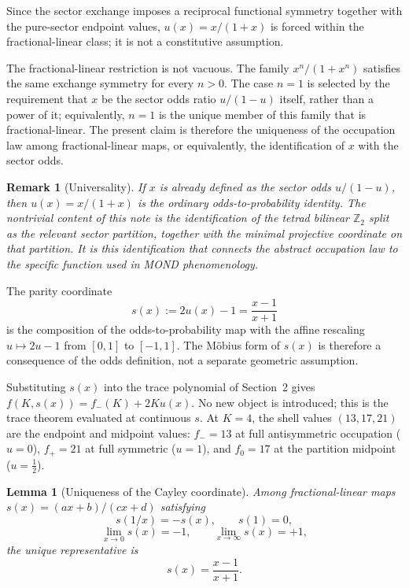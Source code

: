 \documentclass[10pt]{article}
\newtheorem{lemma}{Lemma}
\newtheorem{remark}{Remark}
\begin{document}
Since the sector exchange imposes a reciprocal functional symmetry together
with the pure-sector endpoint values, $u(x)=x/(1+x)$ is forced within the
fractional-linear class; it is not a constitutive assumption.

The fractional-linear restriction is not vacuous.  The family
$x^n/(1+x^n)$ satisfies the same exchange symmetry for every $n>0$.
The case $n=1$ is selected by the requirement that $x$ be the sector odds
ratio $u/(1-u)$ itself, rather than a power of it; equivalently, $n=1$ is
the unique member of this family that is fractional-linear.  The present
claim is therefore the uniqueness of the occupation law among
fractional-linear maps, or equivalently, the identification of $x$ with
the sector odds.

\begin{remark}[Universality]
If $x$ is already defined as the sector odds $u/(1-u)$, then
$u(x)=x/(1+x)$ is the ordinary odds-to-probability identity.  The
nontrivial content of this note is the identification of the tetrad
bilinear $\mathbb Z_2$ split as the relevant sector partition, together
with the minimal projective coordinate on that partition.  It is this
identification that connects the abstract occupation law to the specific
function used in MOND phenomenology.
\end{remark}

The parity coordinate
\[
        s(x):=2u(x)-1=\frac{x-1}{x+1}
\]
is the composition of the odds-to-probability map with the affine rescaling
$u\mapsto 2u-1$ from $[0,1]$ to $[-1,1]$.  The Möbius form of $s(x)$ is
therefore a consequence of the odds definition, not a separate geometric
assumption.

Substituting $s(x)$ into the trace polynomial of Section~2 gives
$f(K,s(x))=f_-(K)+2Ku(x)$.  No new object is introduced; this is the trace
theorem evaluated at continuous $s$.  At $K=4$, the shell values $(13,17,21)$
are the endpoint and midpoint values: $f_-=13$ at full antisymmetric occupation ($u=0$),
$f_+=21$ at full symmetric ($u=1$), and $f_0=17$ at the partition midpoint
($u=\frac12$).

\begin{lemma}[Uniqueness of the Cayley coordinate]
Among fractional-linear maps $s(x)=(ax+b)/(cx+d)$ satisfying
\[
        s(1/x)=-s(x),\qquad s(1)=0,
\]
\[
        \lim_{x\to0}s(x)=-1,
        \qquad
        \lim_{x\to\infty}s(x)=+1,
\]
the unique representative is
\[
        s(x)=\frac{x-1}{x+1}.
\]
\end{lemma}
\end{document}
